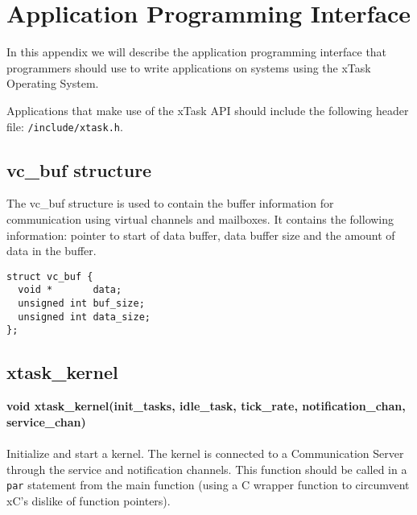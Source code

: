 \newpage
\section{Application Programming Interface}
In this appendix we will describe the application programming interface that
programmers should use to write applications on systems using the
xTask Operating System.

Applications that make use of the xTask API should include the following 
header file: \verb|/include/xtask.h|.

\subsection{vc\_buf structure}
\noindent
The vc\_buf structure is used to contain the buffer information for communication
using virtual channels and mailboxes. It contains the following information:
pointer to start of data buffer, data buffer size and the amount of data in the buffer.

\begin{verbatim}
struct vc_buf {
  void *       data;
  unsigned int buf_size;
  unsigned int data_size;
};
\end{verbatim}



\subsection{xtask\_kernel}
\noindent
\textbf{void xtask\_kernel(init\_tasks, idle\_task, tick\_rate,
notification\_chan, service\_chan)}\\\\
Initialize and start a kernel. The kernel is connected to a 
Communication Server through the service and notification channels.
This function should be called in a \verb|par| statement from the main function 
(using a C wrapper function to circumvent xC's dislike of function pointers).\\

